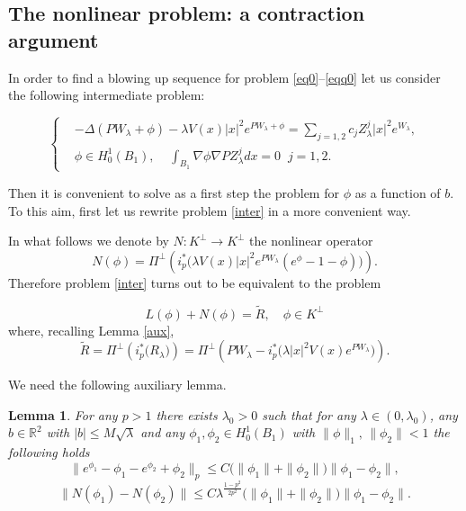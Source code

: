 \documentclass[reqno,11pt]{amsart}
\newtheorem{lemma}[thm]{Lemma}
\theoremstyle{definition}
\numberwithin{equation}{section}
\newcommand{\R}{\mathbb{R}}
\newcommand{\la}{\lambda}
\newcommand{\into}{\int_{B_1}}
\renewcommand{\(}{\left(}
\renewcommand{\)}{\right)}
\renewcommand{\[}{\left[}
\renewcommand{\]}{\right]}
\newcommand{\beq}{\begin{equation}}
\newcommand{\eeq}{\end{equation}}
\begin{document}
{ 

\subsection{{\large{The nonlinear problem: a contraction argument}}}
In order to find a blowing up sequence for problem \eqref{eq0}--\eqref{eqq0} let us consider the following intermediate problem:

\beq\label{inter}\left\{\begin{aligned}&-\Delta(PW_\la+\phi)-\la V(x) |x|^{2}e^{PW_\la+\phi}=\sum_{j=1,2}c_j Z_\la^j|x|^{2} e^{W_\la},\\ &\phi \in H^1_0(B_1),\;\;\;\; \into \nabla \phi\nabla PZ_\la^jdx=0 \; \; j=1,2.\end{aligned}\right.\eeq
 
 Then it is convenient to solve as a first step the problem for $\phi$ as a function of $b$. 
 To this aim, first let us rewrite problem \eqref{inter} in a more convenient way. 
 
 In what follows we denote by $N:K^\perp\to K^\perp$ the nonlinear operator 
$$N(\phi)=\Pi^\perp\({i^*_{p}}\big(       \la V(x)|x|^{2}e^{PW_\la}(e^{\phi}-1-    \phi) \big)\).$$
 Therefore problem \eqref{inter} turns out to be equivalent to the problem
 
 \beq\label{interop}  L(\phi)+N(\phi)=\tilde R,\quad \phi\in K^\perp\eeq
 where, recalling Lemma \ref{aux},  $$\tilde R=\Pi^\perp\({i^*_{p}}\big(R_\la\big)\)=
  \Pi^\perp\(PW_\la -{i^*_{p}}\big(\la|x|^{2}V(x)e^{P W_\la}\big)\).$$
 
 We need the following auxiliary lemma.
 
 \begin{lemma}\label{auxnonl} 
 For any $p> 1$ there exists $\la_0>0$ such that   for any $\la\in (0,\la_0)$, any $b\in \R^2$ with $|b|\leq M \sqrt\la$  and any $\phi_1,\phi_2\in H_0^1(B_1)$ with $\|\phi\|_1,\,\|\phi_2\|<1$ the following holds
\beq\label{skate1}\|e^{\phi_1}-\phi_1-e^{\phi_2}+\phi_2\|_p\leq C\big(\|\phi_1\|+\|\phi_2\|\big)\|\phi_1-\phi_2\|,\eeq
 \beq\label{skate2}\|N(\phi_1)-N(\phi_2)\|\leq C\la^{\frac{1-p^2}{ 2p^2}}\big(\|\phi_1\|+\|\phi_2\|\big)\|\phi_1-\phi_2\|.\eeq
 

\end{lemma}}
\end{document}
